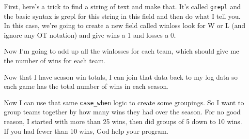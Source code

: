 \documentclass[]{book}
\newenvironment{Shaded}{\begin{snugshade}}{\end{snugshade}}
\newcommand{\DataTypeTok}[1]{\textcolor[rgb]{0.13,0.29,0.53}{#1}}
\newcommand{\DecValTok}[1]{\textcolor[rgb]{0.00,0.00,0.81}{#1}}
\newcommand{\KeywordTok}[1]{\textcolor[rgb]{0.13,0.29,0.53}{\textbf{#1}}}
\newcommand{\NormalTok}[1]{#1}
\newcommand{\OperatorTok}[1]{\textcolor[rgb]{0.81,0.36,0.00}{\textbf{#1}}}
\newcommand{\StringTok}[1]{\textcolor[rgb]{0.31,0.60,0.02}{#1}}
\begin{document}
First, here's a trick to find a string of text and make that. It's called \texttt{grepl} and the basic syntax is grepl for this string in this field and then do what I tell you. In this case, we're going to create a new field called winloss look for W or L (and ignore any OT notation) and give wins a 1 and losses a 0.

\begin{Shaded}
\end{Shaded}

Now I'm going to add up all the winlosses for each team, which should give me the number of wins for each team.

\begin{Shaded}
\end{Shaded}

Now that I have season win totals, I can join that data back to my log data so each game has the total number of wins in each season.

\begin{Shaded}
\end{Shaded}

Now I can use that same \texttt{case\_when} logic to create some groupings. So I want to group teams together by how many wins they had over the season. For no good reason, I started with more than 25 wins, then did groups of 5 down to 10 wins. If you had fewer than 10 wins, God help your program.
\end{document}
